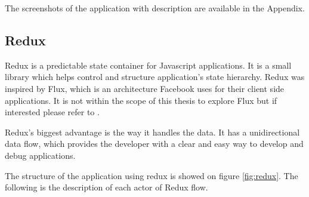 \documentclass[thesis=M,english]{FITthesis}[2012/10/20]
\begin{document}
The screenshots of the application with description are available in the Appendix.

\subsection{Redux}
\label{redux-section}
Redux is a predictable state container for Javascript applications. It is a small library which helps control and structure application's state hierarchy. Redux was inspired by Flux, which is an architecture Facebook uses for  their client side applications. It is not within the scope of this thesis to explore Flux but if interested please refer to \cite{fb-flux}. 

Redux's biggest advantage is the way it handles the data. It has a unidirectional data flow, which provides the developer with a clear and easy way to develop and debug applications.

The structure of the application using redux is showed on figure \ref{fig:redux}. The following is the description of each actor of Redux flow.
\end{document}
